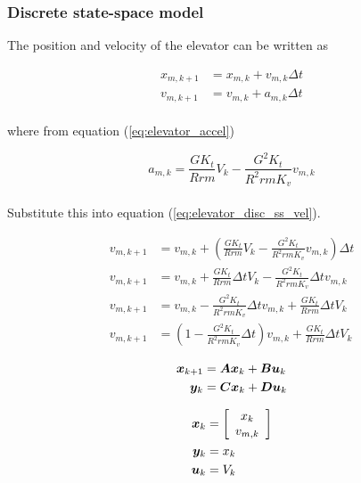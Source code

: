 \subsubsection{Discrete state-space model}

The position and velocity of the elevator can be written as

\begin{align}
  x_{m,k+1} &= x_{m,k} + v_{m,k} \Delta t \label{eq:elevator_disc_ss_pos} \\
  v_{m,k+1} &= v_{m,k} + a_{m,k} \Delta t \label{eq:elevator_disc_ss_vel}
\end{align}
\\
where from equation (\ref{eq:elevator_accel})

\begin{equation*}
  a_{m,k} = \frac{GK_t}{Rrm} V_k - \frac{G^2 K_t}{R^2 rm K_v} v_{m,k}
\end{equation*}
\\
Substitute this into equation (\ref{eq:elevator_disc_ss_vel}).

\begin{align}
  v_{m,k+1} &= v_{m,k} + \left(\frac{GK_t}{Rrm} V_k -
    \frac{G^2 K_t}{R^2 rm K_v} v_{m,k}\right) \Delta t \nonumber \\
  v_{m,k+1} &= v_{m,k} + \frac{GK_t}{Rrm} \Delta t V_k -
    \frac{G^2 K_t}{R^2 rm K_v} \Delta t v_{m,k} \nonumber \\
  v_{m,k+1} &= v_{m,k} - \frac{G^2 K_t}{R^2 rm K_v} \Delta t v_{m,k} +
    \frac{GK_t}{Rrm} \Delta t V_k \nonumber \\
  v_{m,k+1} &= \left(1 - \frac{G^2 K_t}{R^2 rm K_v} \Delta t\right) v_{m,k} +
    \frac{GK_t}{Rrm} \Delta t V_k
\end{align}

\begin{align*}
  \bm x_{k+1} &= \bm A \bm x_k + \bm B \bm u_k \\
  \bm y_k &= \bm C \bm x_k + \bm D \bm u_k
\end{align*}

\begin{align*}
  \bm x_k &= \left[
  \begin{array}{c}
    x_k \\
    v_{m,k}
  \end{array}
  \right] \\
  \bm y_k &= x_k \\
  \bm u_k &= V_k
\end{align*}

